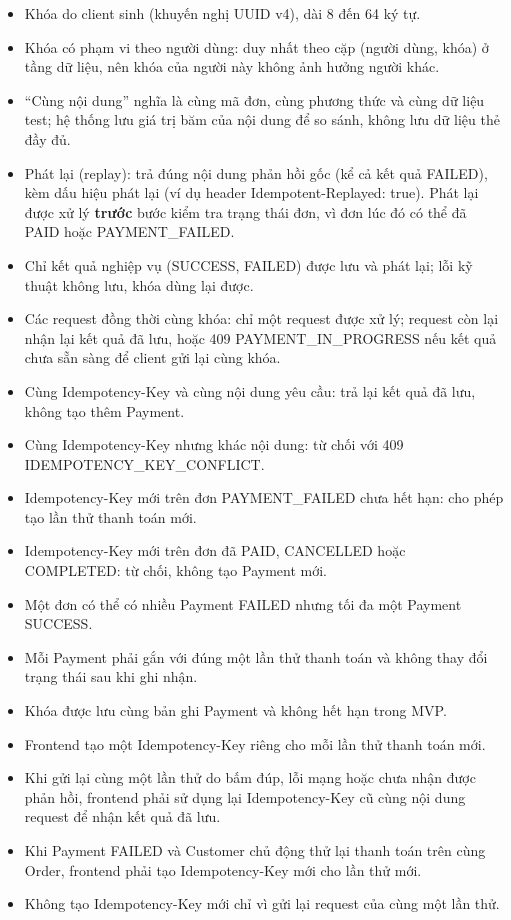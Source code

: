 \documentclass[11pt,a4paper,oneside]{report}
\begin{document}
\begin{itemize}
\item
  Khóa do client sinh (khuyến nghị UUID v4), dài 8 đến 64 ký tự.
\item
  Khóa có phạm vi theo người dùng: duy nhất theo cặp (người dùng, khóa) ở tầng dữ liệu, nên khóa của người này không ảnh hưởng người khác.
\item
  ``Cùng nội dung'' nghĩa là cùng mã đơn, cùng phương thức và cùng dữ liệu test; hệ thống lưu giá trị băm của nội dung để so sánh, không lưu dữ liệu thẻ đầy đủ.
\item
  Phát lại (replay): trả đúng nội dung phản hồi gốc (kể cả kết quả FAILED), kèm dấu hiệu phát lại (ví dụ header Idempotent-Replayed: true). Phát lại được xử lý \textbf{trước} bước kiểm tra trạng thái đơn, vì đơn lúc đó có thể đã PAID hoặc PAYMENT\_FAILED.
\item
  Chỉ kết quả nghiệp vụ (SUCCESS, FAILED) được lưu và phát lại; lỗi kỹ thuật không lưu, khóa dùng lại được.
\item
  Các request đồng thời cùng khóa: chỉ một request được xử lý; request còn lại nhận lại kết quả đã lưu, hoặc 409 PAYMENT\_IN\_PROGRESS nếu kết quả chưa sẵn sàng để client gửi lại cùng khóa.
\item
  Cùng Idempotency-Key và cùng nội dung yêu cầu: trả lại kết quả đã lưu, không tạo thêm Payment.
\item
  Cùng Idempotency-Key nhưng khác nội dung: từ chối với 409 IDEMPOTENCY\_KEY\_CONFLICT.
\item
  Idempotency-Key mới trên đơn PAYMENT\_FAILED chưa hết hạn: cho phép tạo lần thử thanh toán mới.
\item
  Idempotency-Key mới trên đơn đã PAID, CANCELLED hoặc COMPLETED: từ chối, không tạo Payment mới.
\item
  Một đơn có thể có nhiều Payment FAILED nhưng tối đa một Payment SUCCESS.
\item
  Mỗi Payment phải gắn với đúng một lần thử thanh toán và không thay đổi trạng thái sau khi ghi nhận.
\item
  Khóa được lưu cùng bản ghi Payment và không hết hạn trong MVP.
\item
  Frontend tạo một Idempotency-Key riêng cho mỗi lần thử thanh toán mới.
\item
  Khi gửi lại cùng một lần thử do bấm đúp, lỗi mạng hoặc chưa nhận được phản hồi, frontend phải sử dụng lại Idempotency-Key cũ cùng nội dung request để nhận kết quả đã lưu.
\item
  Khi Payment FAILED và Customer chủ động thử lại thanh toán trên cùng Order, frontend phải tạo Idempotency-Key mới cho lần thử mới.
\item
  Không tạo Idempotency-Key mới chỉ vì gửi lại request của cùng một lần thử.
\end{itemize}
\end{document}
